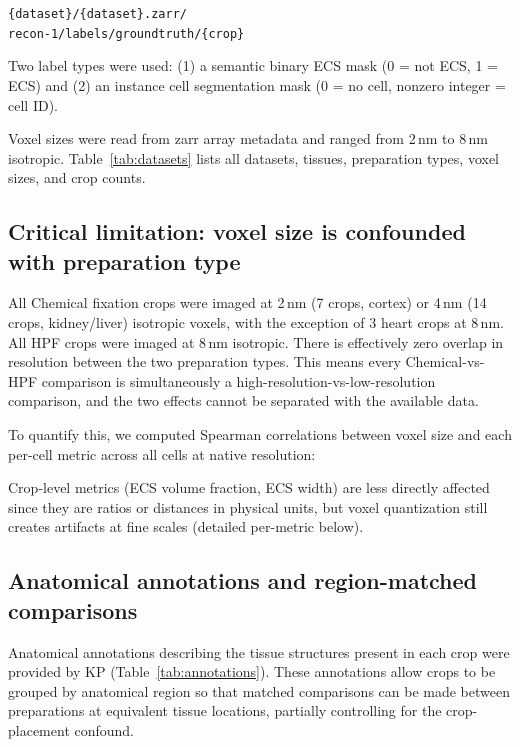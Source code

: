 \documentclass[times, twoside]{zHenriquesLab-StyleBioRxiv}
\begin{document}
{\small\texttt{\{dataset\}/\{dataset\}.zarr/\\recon-1/labels/groundtruth/\{crop\}}}

\noindent Two label types were used: (1) a semantic binary ECS mask (0 = not ECS, 1 = ECS) and (2) an instance cell segmentation mask (0 = no cell, nonzero integer = cell ID).

Voxel sizes were read from zarr array metadata and ranged from 2\,nm to 8\,nm isotropic. Table~\ref{tab:datasets} lists all datasets, tissues, preparation types, voxel sizes, and crop counts.

\subsection*{Critical limitation: voxel size is confounded with preparation type}
All Chemical fixation crops were imaged at 2\,nm (7 crops, cortex) or 4\,nm (14 crops, kidney/liver) isotropic voxels, with the exception of 3 heart crops at 8\,nm. All HPF crops were imaged at 8\,nm isotropic. There is effectively zero overlap in resolution between the two preparation types. This means every Chemical-vs-HPF comparison is simultaneously a high-resolution-vs-low-resolution comparison, and the two effects cannot be separated with the available data.

To quantify this, we computed Spearman correlations between voxel size and each per-cell metric across all cells at native resolution:

\begin{table}[h]
\centering
{}
\end{table}

Crop-level metrics (ECS volume fraction, ECS width) are less directly affected since they are ratios or distances in physical units, but voxel quantization still creates artifacts at fine scales (detailed per-metric below).

\subsection*{Anatomical annotations and region-matched comparisons}
Anatomical annotations describing the tissue structures present in each crop were provided by KP (Table~\ref{tab:annotations}). These annotations allow crops to be grouped by anatomical region so that matched comparisons can be made between preparations at equivalent tissue locations, partially controlling for the crop-placement confound.
\end{document}
